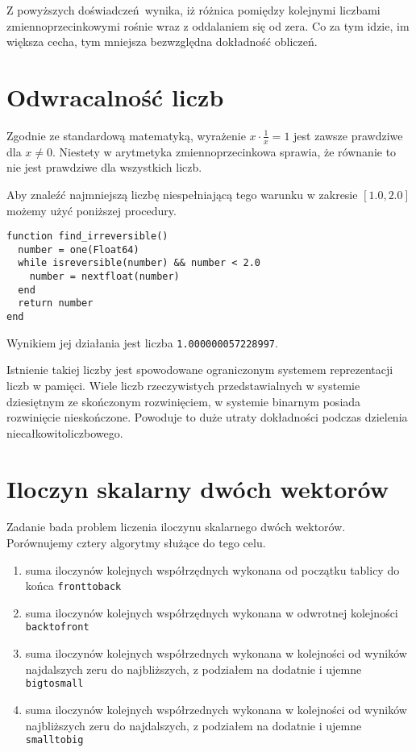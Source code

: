 \documentclass{article}
\begin{document}
Z powyższych doświadczeń wynika, iż różnica pomiędzy kolejnymi liczbami zmiennoprzecinkowymi rośnie wraz z oddalaniem się od zera.
Co za tym idzie, im większa cecha, tym mniejsza bezwzględna dokładność obliczeń.

\section{Odwracalność liczb}

Zgodnie ze standardową matematyką, wyrażenie $x \cdot \frac{1}{x} = 1$ jest zawsze prawdziwe dla $x \neq 0$.
Niestety w arytmetyka zmiennoprzecinkowa sprawia, że równanie to nie jest prawdziwe dla wszystkich liczb.

Aby znaleźć najmniejszą liczbę niespełniającą tego warunku w zakresie $[1.0, 2.0]$ możemy użyć poniższej procedury.

\begin{lstlisting}
function find_irreversible()
  number = one(Float64)
  while isreversible(number) && number < 2.0
    number = nextfloat(number)
  end
  return number
end
\end{lstlisting}

Wynikiem jej działania jest liczba \texttt{1.000000057228997}.

Istnienie takiej liczby jest spowodowane ograniczonym systemem reprezentacji liczb w pamięci.
Wiele liczb rzeczywistych przedstawialnych w systemie dziesiętnym ze skończonym rozwinięciem, w systemie binarnym posiada rozwinięcie nieskończone.
Powoduje to duże utraty dokładności podczas dzielenia niecałkowitoliczbowego.

\section{Iloczyn skalarny dwóch wektorów}

Zadanie bada problem liczenia iloczynu skalarnego dwóch wektorów.
Porównujemy cztery algorytmy służące do tego celu.

\begin{enumerate}
  \item suma iloczynów kolejnych współrzędnych wykonana od początku tablicy do końca \texttt{fronttoback}
  \item suma iloczynów kolejnych współrzędnych wykonana w odwrotnej kolejności \texttt{backtofront}
  \item suma iloczynów kolejnych współrzednych wykonana w kolejności od wyników najdalszych zeru do najbliższych, z podziałem na dodatnie i ujemne \texttt{bigtosmall}
  \item suma iloczynów kolejnych współrzednych wykonana w kolejności od wyników najbliższych zeru do najdalszych, z podziałem na dodatnie i ujemne \texttt{smalltobig}
\end{enumerate}
\end{document}
